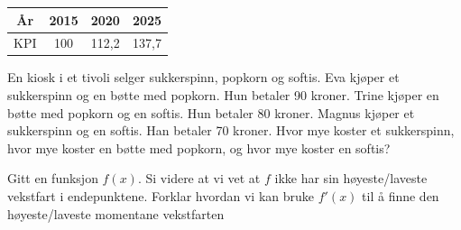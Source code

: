\begin{center}
	\begin{tabular}{|c|c|c|c|}
		\hline
		År & 2015 & 2020 & 2025 \\ \hline
		KPI & 100 & 112,2 & 137,7 \\ \hline
	\end{tabular}
\end{center}

En kiosk i et tivoli selger sukkerspinn, popkorn og softis.
Eva kjøper et sukkerspinn og en bøtte med popkorn. Hun betaler 90 kroner.
Trine kjøper en bøtte med popkorn og en softis. Hun betaler 80 kroner.
Magnus kjøper et sukkerspinn og en softis. Han betaler 70 kroner.
Hvor mye koster et sukkerspinn, hvor mye koster en bøtte med popkorn, og hvor mye
koster en softis?

Gitt en funksjon $f(x)$. Si videre at vi vet at $f$ ikke har sin høyeste/laveste vekstfart i endepunktene. Forklar hvordan vi kan bruke $f'(x)$ til å finne den høyeste/laveste momentane vekstfarten



